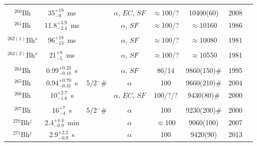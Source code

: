 \begin{center}
\begin{longtable}{c|ccccccl}
\hline\\
$^{260}$Bh	& 35$^{+19}_{-9}$~ms& 		&$\alpha$, $EC$, $SF$&$\approx$100/?&10400(60)      &2008	&{\tiny\cite{Nelson2008}}\\
$^{261}$Bh  & 11.8$^{+3.9}_{-2.4}$~ms& 	&$\alpha$, $SF$		&$\approx$100/?&$\approx$10160	&1986	&{\tiny\cite{Oganessian1976,Muenzenberg1981,Muenzenberg1986,Muenzenberg1989,Nelson2008a,Hessberger2010a}}\\
			&				&			&					&			& 				    &		&{\tiny\cite{Ito2018,ZhaoZ2024}}\\
$^{262(1)}$Bh$^s$& 96$^{+18}_{-13}$~ms& &$\alpha$, $SF$		&$\approx$100/?&$\approx$10080	&1981	&{\tiny\cite{Muenzenberg1981,Oganessian1984,Muenzenberg1988a,Muenzenberg1989,Hofmann1997b,Holden2000}}\\
			&				&			&					&			& 				    &		&{\tiny\cite{Folden2006,Nelson2008a,Hessberger2009,Nelson2009,Ito2018,ZhaoZ2024}}\\
$^{262(2)}$Bh$^s$& 21$^{+8}_{-5}$~ms& 	&$\alpha$, $SF$		&$\approx$100/?&$\approx$10550	&1981   &{\tiny\cite{Muenzenberg1981,Oganessian1984,Muenzenberg1988a,Muenzenberg1989,Hofmann1997b,Holden2000}}\\
			&				&			&					&			& 				    &		&{\tiny\cite{Folden2006,Nelson2008a,Hessberger2009,Nelson2009,Ito2018,ZhaoZ2024}}\\
$^{264}$Bh	& 0.99$^{+0.23}_{-0.18}$~s& &$\alpha$, $SF$		&86/14		&9860(150)$\#$	    &1995	&{\tiny\cite{Hofmann1995a,Hofmann2002,Gan2004,Morita2004c,Morita2004a,Morimoto2004}}\\
$^{265}$Bh	& 0.94$^{+0.70}_{-0.31}$~s&5/2$^-$\# &$\alpha$  &100		&9660(210)$\#$	    &2004	&{\tiny\cite{Gan2004}}\\	
$^{266}$Bh	& 10$^{+2.7}_{-1.6}$~s& 	&$\alpha$, $EC$, $SF$&100/?/?	&9430(80)$\#$	    &2000	&{\tiny\cite{Wilk2000,Morita2004b,Morimoto2006,Morita2007a,Morita2009,Morita2010}}\\
			&				&			&					&			& 				    &		&{\tiny\cite{Morita2012,Morita2015,Haba2020}}\\
$^{267}$Bh	& 16$^{+7}_{-4}$~s&5/2$^-$\#&$\alpha$			&100		&9230(200)$\#$	    &2000	&{\tiny\cite{Wilk2000,Eichler2000,Tuerler2002,Haba2020}}\\
$^{270}$Bh$^j$& 2.4$^{+4.4}_{-0.9}$~min&&$\alpha$			&$\approx$100&9060(100)		    &2007	&{\tiny\cite{Oganessian2007b,Oganessian2007a,Oganessian2011a,Oganessian2015,Oganessian2022d}}\\
$^{271}$Bh$^j$& 2.9$^{+2.2}_{-0.9}$~s& 	&$\alpha$			&100		&9420(90)		    &2013	&{\tiny\cite{Oganessian2004b,Oganessian2007,Oganessian2013,Rudolph2013,Oganessian2015,Oganessian2022d}}\\

\end{longtable}
\end{center}
